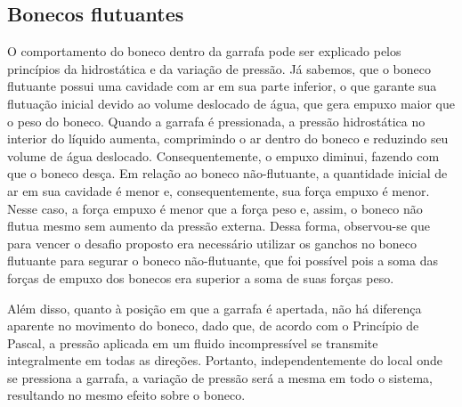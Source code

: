 \subsection{Bonecos flutuantes}
O comportamento do boneco dentro da garrafa pode ser explicado pelos princípios
da hidrostática e da variação de pressão. Já sabemos, que o boneco flutuante possui uma
cavidade com ar em sua parte inferior, o que garante sua flutuação inicial
devido ao volume deslocado de água, que gera empuxo maior que o peso do boneco.
Quando a garrafa é pressionada, a pressão hidrostática no interior do líquido
aumenta, comprimindo o ar dentro do boneco e reduzindo seu volume de água
deslocado. Consequentemente, o empuxo diminui, fazendo com que o boneco desça.
Em relação ao boneco não-flutuante, a quantidade inicial de ar em sua cavidade
é menor e, consequentemente, sua força empuxo é menor. Nesse caso, a força
empuxo é menor que a força peso e, assim, o boneco não flutua mesmo sem aumento
da pressão externa. Dessa forma, observou-se que para vencer o desafio
proposto era necessário utilizar os ganchos no boneco flutuante para segurar o
boneco não-flutuante, que foi possível pois a soma das forças de empuxo dos
bonecos era superior a soma de suas forças peso.

Além disso, quanto à posição em que a garrafa é apertada, não há diferença
aparente no movimento do boneco, dado que, de acordo com o Princípio de Pascal,
a pressão aplicada em um fluido incompressível se transmite integralmente em
todas as direções. Portanto, independentemente do local onde se pressiona a
garrafa, a variação de pressão será a mesma em todo o sistema, resultando no
mesmo efeito sobre o boneco.

